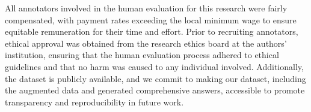 All annotators involved in the human evaluation for this research were fairly compensated, with payment rates exceeding the local minimum wage to ensure equitable remuneration for their time and effort. Prior to recruiting annotators, ethical approval was obtained from the research ethics board at the authors’ institution, ensuring that the human evaluation process adhered to ethical guidelines and that no harm was caused to any individual involved. Additionally, the \fd{} dataset is publicly available, and we commit to making our dataset, including the augmented data and generated comprehensive answers, accessible to promote transparency and reproducibility in future work.
